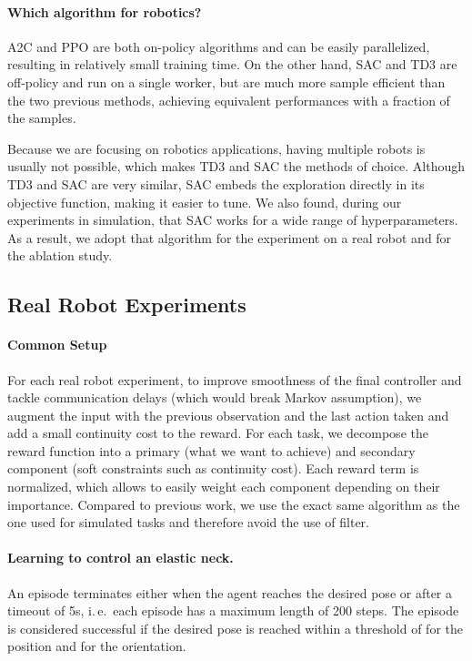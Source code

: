 \documentclass{article}
\newcommand{\ie}{i.\,e.\ }
\newcommand{\aac}{\textsc{A2C}\xspace}
\newcommand{\ppo}{\textsc{PPO}\xspace}
\newcommand{\sac}{\textsc{SAC}\xspace}
\newcommand{\tddd}{\textsc{TD3}\xspace}
\begin{document}
\paragraph{Which algorithm for robotics?}

\aac and \ppo are both on-policy algorithms and can be easily parallelized, resulting in relatively small training time.
On the other hand, \sac and \tddd are off-policy and run on a single worker, but are much more sample efficient than the two previous methods, achieving equivalent performances with a fraction of the samples.

Because we are focusing on robotics applications, having multiple robots is usually not possible, which makes \tddd and \sac the methods of choice. Although \tddd and \sac are very similar, \sac embeds the exploration directly in its objective function, making it easier to tune. We also found, during our experiments in simulation, that \sac works for a wide range of hyperparameters. As a result, we adopt that algorithm for the experiment on a real robot and for the ablation study.

\subsection{Real Robot Experiments}

\paragraph{Common Setup}
For each real robot experiment, to improve smoothness of the final controller and tackle communication delays (which would break Markov assumption), we augment the input with the previous observation and the last action taken and add a small continuity cost to the reward.
For each task, we decompose the reward function into a primary (what we want to achieve) and secondary component (soft constraints such as continuity cost).
Each reward term is normalized, which allows to easily weight each component depending on their importance.
Compared to previous work, we use the exact same algorithm as the one used for simulated tasks and therefore avoid the use of filter.


\paragraph{Learning to control an elastic neck.}
An episode terminates either when the agent reaches the desired pose or after a timeout of 5s, \ie each episode has a maximum length of 200 steps. The episode is considered successful if the desired pose is reached within a threshold of  for the position and  for the orientation.
\end{document}
